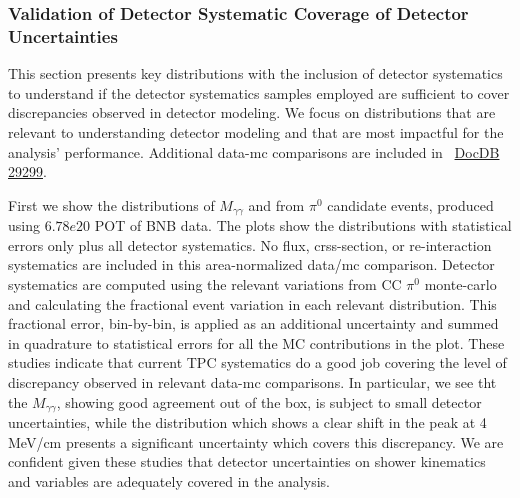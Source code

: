 \subsubsection{Validation of Detector Systematic Coverage of Detector Uncertainties}
\label{sec:detsys:datamc}
\par This section presents key distributions with the inclusion of detector systematics to understand if the detector systematics samples employed are sufficient to cover discrepancies observed in detector modeling. We focus on distributions that are relevant to understanding detector modeling and that are most impactful for the analysis' performance. Additional data-mc comparisons are included in ~\href{https://microboone-docdb.fnal.gov/cgi-bin/private/ShowDocument?docid=29299}{DocDB 29299}.
\par First we show the distributions of $M_{\gamma\gamma}$ and \dedx from $\pi^0$ candidate events, produced using $6.78e20$ POT of BNB data. 
The plots show the distributions with statistical errors only plus all detector systematics. No flux, crss-section, or re-interaction systematics are included in this area-normalized data/mc comparison. Detector systematics are computed using the relevant variations from CC $\pi^0$ monte-carlo and calculating the fractional event variation in each relevant distribution. This fractional error, bin-by-bin, is applied as an additional uncertainty and summed in quadrature to statistical errors for all the MC contributions in the plot. These studies indicate that current TPC systematics do a good job covering the level of discrepancy observed in relevant data-mc comparisons. In particular, we see tht the $M_{\gamma\gamma}$, showing good agreement out of the box, is subject to small detector uncertainties, while the \dedx distribution which shows  a clear shift in the peak at 4 MeV/cm presents a significant uncertainty which covers this discrepancy. We are confident given these studies that detector uncertainties on shower kinematics and variables are adequately covered in the analysis.

